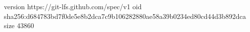 version https://git-lfs.github.com/spec/v1
oid sha256:d684783bd7f0de5e8b2dca7c9b106282880ae58a39b0234ed80cd44d3b892dca
size 43860
